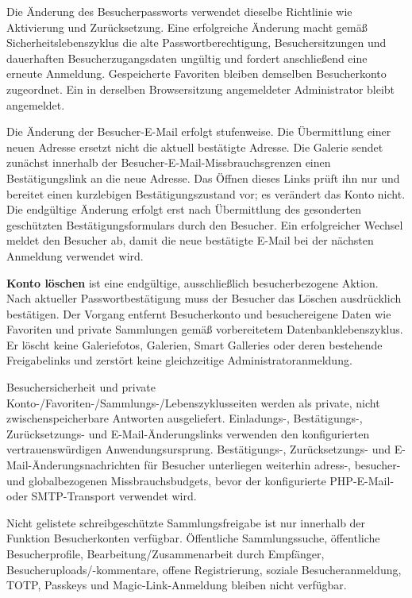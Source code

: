 \documentclass[11pt,a4paper]{article}
\newcommand{\ui}[1]{\textbf{#1}}
\begin{document}
Die Änderung des Besucherpassworts verwendet dieselbe Richtlinie wie Aktivierung
und Zurücksetzung. Eine erfolgreiche Änderung macht gemäß
Sicherheitslebenszyklus die alte Passwortberechtigung, Besuchersitzungen und
dauerhaften Besucherzugangsdaten ungültig und fordert anschließend eine erneute
Anmeldung. Gespeicherte Favoriten bleiben demselben Besucherkonto zugeordnet.
Ein in derselben Browsersitzung angemeldeter Administrator bleibt angemeldet.

Die Änderung der Besucher-E-Mail erfolgt stufenweise. Die Übermittlung einer
neuen Adresse ersetzt nicht die aktuell bestätigte Adresse. Die Galerie sendet
zunächst innerhalb der Besucher-E-Mail-Missbrauchsgrenzen einen Bestätigungslink
an die neue Adresse. Das Öffnen dieses Links prüft ihn nur und bereitet einen
kurzlebigen Bestätigungszustand vor; es verändert das Konto nicht. Die
endgültige Änderung erfolgt erst nach Übermittlung des gesonderten geschützten
Bestätigungsformulars durch den Besucher. Ein erfolgreicher Wechsel meldet den
Besucher ab, damit die neue bestätigte E-Mail bei der nächsten Anmeldung
verwendet wird.

\ui{Konto löschen} ist eine endgültige, ausschließlich besucherbezogene Aktion.
Nach aktueller Passwortbestätigung muss der Besucher das Löschen ausdrücklich
bestätigen. Der Vorgang entfernt Besucherkonto und besuchereigene Daten wie
Favoriten und private Sammlungen gemäß vorbereitetem Datenbanklebenszyklus. Er
löscht keine Galeriefotos, Galerien, Smart Galleries oder deren bestehende
Freigabelinks und zerstört keine gleichzeitige Administratoranmeldung.

Besuchersicherheit und private Konto-/Favoriten-/Sammlungs-/Lebenszyklusseiten
werden als private, nicht zwischenspeicherbare Antworten ausgeliefert.
Einladungs-, Bestätigungs-, Zurücksetzungs- und E-Mail-Änderungslinks verwenden
den konfigurierten vertrauenswürdigen Anwendungsursprung. Bestätigungs-,
Zurücksetzungs- und E-Mail-Änderungsnachrichten für Besucher unterliegen
weiterhin adress-, besucher- und globalbezogenen Missbrauchsbudgets, bevor der
konfigurierte PHP-E-Mail- oder SMTP-Transport verwendet wird.

Nicht gelistete schreibgeschützte Sammlungsfreigabe ist nur innerhalb der
Funktion Besucherkonten verfügbar. Öffentliche Sammlungssuche, öffentliche
Besucherprofile, Bearbeitung/Zusammenarbeit durch Empfänger,
Besucheruploads/-kommentare, offene Registrierung, soziale Besucheranmeldung,
TOTP, Passkeys und Magic-Link-Anmeldung bleiben nicht verfügbar.
\end{document}
